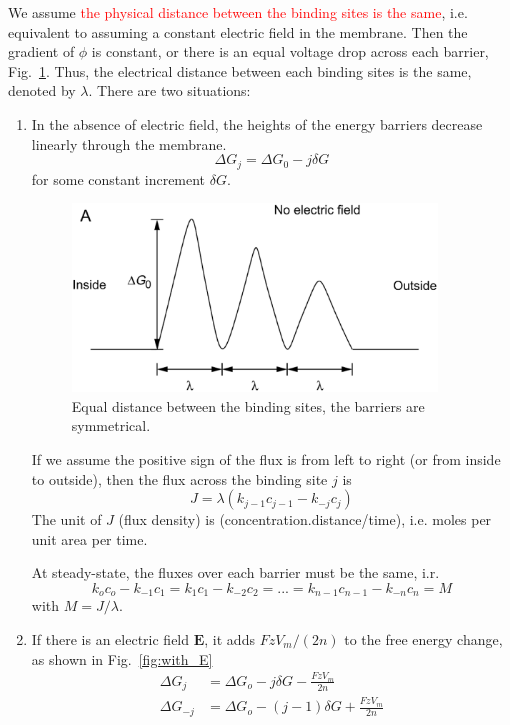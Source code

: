 We assume
\textcolor{red}{the physical distance between the binding sites is the
  same},
i.e. equivalent to assuming a constant electric field in the
membrane. Then the gradient of $\phi$ is constant, or there is an
equal voltage drop across each barrier,
Fig.~\ref{fig:constant-E}. Thus, the electrical distance between each
binding sites is the same, denoted by $\lambda$. There are two
situations:
\begin{enumerate}
\item In the absence of electric field, the heights of the energy
  barriers decrease linearly through the membrane.
  \begin{equation}
    \label{eq:1395}
    \Delta G_j=\Delta G_0-j\delta G
  \end{equation}
  for some constant increment $\delta G$.

  \begin{figure}[hbt]
    \centerline{\includegraphics[height=5cm,
      angle=0]{./images/constant-E.eps}}
    \caption{Equal distance between the binding sites, the barriers are
      symmetrical.}
    \label{fig:constant-E}
  \end{figure}

  If we assume the positive sign of the flux is from left to right (or
  from inside to outside), then the flux across the binding site $j$ is
  \begin{equation}
    \label{eq:1396}
    J = \lambda (k_{j-1}c_{j-1}-k_{-j}c_j)
  \end{equation}
  The unit of $J$ (flux density) is (concentration.distance/time),
  i.e. moles per unit area per time.

  At steady-state, the fluxes over each barrier must be the same, i.r.
  \begin{equation}
    \label{eq:1398}
    k_oc_o-k_{-1}c_1 = k_1c_1-k_{-2}c_2=...=k_{n-1}c_{n-1}-k_{-n}c_n=M
  \end{equation}
  with $M=J/\lambda$.


\item If there is an electric field $\mathbf{E}$, it adds $FzV_m/(2n)$
  to the free energy change, as shown in Fig.~\ref{fig:with_E}
  \begin{equation}
    \label{eq:1400}
    \begin{split}
      \Delta G_j&=\Delta G_o-j\delta G - \frac{FzV_m}{2n} \\
      \Delta G_{-j}&=\Delta G_o-(j-1)\delta G + \frac{FzV_m}{2n} \\
    \end{split}
  \end{equation}


\end{enumerate}
